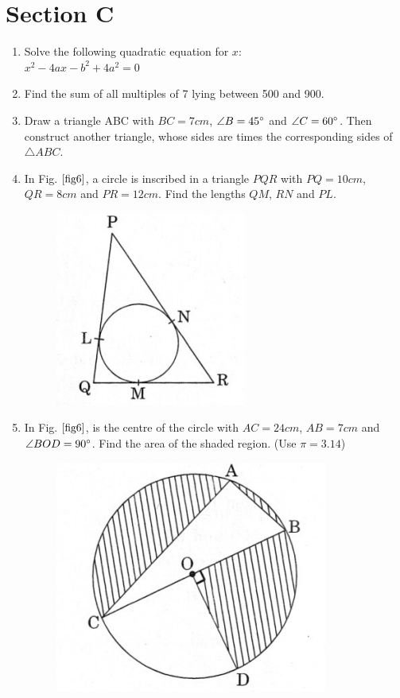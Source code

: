 \documentclass[journal,12pt,twocolumn]{IEEEtran}
\renewcommand\thesection{\arabic{section}}
\begin{document}
\section{Section C}
\renewcommand{\theequation}{\theenumi}
\begin{enumerate}[label=\thesection.\arabic*.,ref=\thesection.\theenumi]
\item Solve the following quadratic equation for $x:$ \\
$x^2-4ax-b^2+4a^2=0$\\
\item Find the sum of all multiples of 7 lying between 500 and 900. \\
\item Draw a triangle ABC with $BC = 7cm$, $\angle B = 45\degree$ and $\angle C = 60\degree$. Then construct another triangle, whose sides are times the corresponding sides of  $\triangle ABC.$ \\
\item In Fig. $\ref{fig6}$, a circle is inscribed in a triangle $PQR$ with $PQ = 10cm$, $QR = 8cm$ and $PR = 12cm$. Find the lengths $QM$, $RN$ and $PL$.\\
\begin{figure}[h!]
    \centering
    \includegraphics[width=0.5\columnwidth,center]{5.png}
    \caption{}
    \label{fig5}
 \end{figure}
\label{fig5}
\item In Fig. $\ref{fig6}$, is the centre of the circle with $AC = 24cm$, $AB=7cm$ and $\angle BOD = 90\degree$. Find the area of the shaded region. (Use $\pi = 3.14$)\\
\begin{figure}[h!]
    \centering
    \includegraphics[width=0.5\columnwidth,center]{6.png}

\end{figure}
\end{enumerate}
\end{document}
